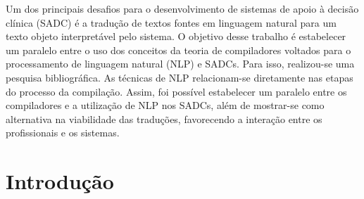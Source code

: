 \documentclass[12pt]{article}
\begin{document}
\begin{resumo} 
Um dos principais desafios para o desenvolvimento de sistemas de apoio à decisão clínica (SADC) é a tradução de textos fontes em linguagem natural para um texto objeto interpretável pelo sistema. O objetivo desse trabalho é estabelecer um paralelo entre o uso dos conceitos da teoria de compiladores voltados para o processamento de linguagem natural (NLP) e SADCs. Para isso, realizou-se uma pesquisa bibliográfica. As técnicas de NLP relacionam-se diretamente nas etapas do processo da compilação. Assim, foi possível estabelecer um paralelo entre os compiladores e a utilização de NLP nos SADCs, além de mostrar-se como alternativa na viabilidade das traduções, favorecendo a interação entre os profissionais e os sistemas.

  
\end{resumo}


% 


\section{Introdução}
\end{document}
